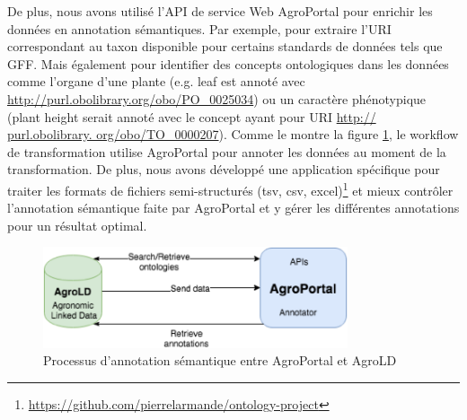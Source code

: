 De plus, nous avons utilisé l'API de service Web AgroPortal pour enrichir les données en annotation sémantiques. Par exemple, pour extraire l'URI correspondant au taxon disponible pour certains standards de données tels que GFF. Mais également pour identifier des concepts ontologiques dans les données comme l'organe d'une plante (e.g. leaf est annoté avec \url{http://purl.obolibrary.org/obo/PO\_0025034}) ou un caractère phénotypique (plant height serait annoté avec le concept ayant pour URI \url{http:// purl.obolibrary. org/obo/TO\_0000207}). Comme le montre la figure \ref{AgroPortal-AgroLD}, le workflow de transformation utilise AgroPortal pour annoter les données au moment de la transformation. De plus, nous avons développé une application spécifique pour traiter les formats de fichiers semi-structurés (tsv, csv, excel)\footnote{\url{https://github.com/pierrelarmande/ontology-project}} et mieux contrôler l'annotation sémantique faite par AgroPortal et y gérer les différentes annotations pour un résultat optimal. \\


\begin{figure}[!ht]
\begin{center}
	\includegraphics[width=0.80\textwidth]{Figures/AgroPortal-AgroLD.png}
\end{center}
\caption{\label{AgroPortal-AgroLD} Processus d'annotation sémantique entre AgroPortal et AgroLD}
\end{figure}

